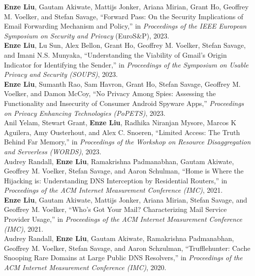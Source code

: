 \documentclass[12pt]{ucsddissertation}
\begin{document}
\begin{vita}
\noindent \textbf{Enze Liu}, Gautam Akiwate, Mattijs Jonker, Ariana Mirian, Grant Ho, Geoffrey M. Voelker, and Stefan Savage, ``Forward Pass: On the Security Implications of Email Forwarding Mechanism and Policy,'' in \textit{Proceedings of the IEEE European Symposium on Security and Privacy} (EuroS\&P), 2023.\\

\noindent \textbf{Enze Liu}, Lu Sun, Alex Bellon, Grant Ho, Geoffrey M. Voelker, Stefan Savage, and Imani N.S. Munyaka, ``Understanding the Viability of Gmail's Origin Indicator for Identifying the Sender,'' in \textit{Proceedings of the Symposium on Usable Privacy and Security (SOUPS)}, 2023.\\

\noindent \textbf{Enze Liu}, Sumanth Rao, Sam Havron, Grant Ho, Stefan Savage, Geoffrey M. Voelker, and Damon McCoy, ``No Privacy Among Spies: Assessing the Functionality and Insecurity of Consumer Android Spyware Apps,'' \textit{Proceedings on Privacy Enhancing Technologies (PoPETS)}, 2023.\\

\noindent Anil Yelam, Stewart Grant, \textbf{Enze Liu}, Radhika Niranjan Mysore, Marcos K Aguilera, Amy Ousterhout, and Alex C. Snoeren, ``Limited Access: The Truth Behind Far Memory,'' in \textit{Proceedings of the
Workshop on Resource Disaggregation and Serverless (WORDS)}, 2023.\\

\noindent Audrey Randall, \textbf{Enze Liu}, Ramakrishna Padmanabhan, Gautam Akiwate, Geoffrey M. Voelker, Stefan Savage, and Aaron Schulman, ``Home is Where the Hijacking is: Understanding DNS Interception by Residential Routers,'' in \textit{Proceedings of the ACM Internet Measurement Conference (IMC)}, 2021.\\

\noindent \textbf{Enze Liu}, Gautam Akiwate, Mattijs Jonker, Ariana Mirian, Stefan Savage, and Geoffrey M. Voelker, ``Who's Got Your Mail? Characterizing Mail Service Provider Usage,'' in \textit{Proceedings of the ACM Internet Measurement Conference (IMC)}, 2021.\\

\noindent Audrey Randall, \textbf{Enze Liu}, Gautam Akiwate, Ramakrishna Padmanabhan, Geoffrey M. Voelker, Stefan Savage, and Aaron Schzulman, ``Trufflehunter: Cache Snooping Rare Domains at Large Public DNS Resolvers,'' in \textit{Proceedings of the ACM Internet Measurement Conference (IMC)}, 2020.\\ 


\end{vita}
\end{document}
